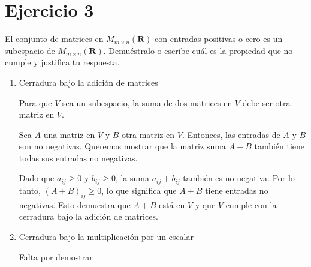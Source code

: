 \section*{Ejercicio 3}
El conjunto de matrices en $M_{m \times n}(\mathbf{R})$ con entradas positivas o cero es un subespacio de $M_{m\times n}(\mathbf{R})$.
Demuéstralo o escribe cuál es la propiedad que no cumple y justifica tu respuesta.

\begin{enumerate}
    \item Cerradura bajo la adición de matrices

    Para que $V$ sea un subespacio, la suma de dos matrices en $V$ debe ser otra matriz en $V$.

    Sea $A$ una matriz en $V$ y $B$ otra matriz en $V$. Entonces, las entradas de $A$ y $B$ son no negativas. Queremos mostrar que la matriz suma $A + B$ también tiene todas sus entradas no negativas.

    Dado que $a_{ij} \geq 0$ y $b_{ij} \geq 0$, la suma $a_{ij} + b_{ij}$ también es no negativa. Por lo tanto, $(A + B)_{ij} \geq 0$, lo que significa que $A + B$ tiene entradas no negativas. Esto demuestra que $A + B$ está en $V$ y que $V$ cumple con la cerradura bajo la adición de matrices.


    \item Cerradura bajo la multiplicación por un escalar

    Falta por demostrar

\end{enumerate}

